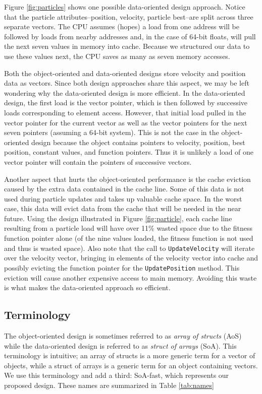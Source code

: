 Figure \ref{fig:particles} shows one possible data-oriented design
approach. Notice that the particle attributes--position, velocity, particle
best--are split across three separate vectors. The CPU
assumes (hopes) a load from one address will be followed by loads from nearby
addresses and, in the case of 64-bit floats, will pull the next seven values in
memory into cache. Because we structured our data to use these values next, the
CPU saves as many as seven memory accesses.

Both the object-oriented and data-oriented designs store velocity and position
data as vectors. Since both design approaches share this aspect, we may be left
wondering why the data-oriented design is more efficient. In the
data-oriented design, the first load is the vector pointer, which is then
followed by successive loads corresponding to element access. However, that
initial load pulled in the vector pointer for the current vector as well as the
vector pointers for the next seven pointers (assuming a 64-bit system). This is
not the case in the object-oriented design because the object contains pointers
to velocity, position, best position, constant values, and function
pointers. Thus it is unlikely a load of one vector pointer will contain the
pointers of successive vectors.

Another aspect that hurts the object-oriented performance is the cache eviction
caused by the extra data contained in the cache line. Some of this data is not
used during particle updates and takes up valuable cache space. In the worst case,
this data will evict data from the cache that will be needed in the near
future. Using the design illustrated in Figure \ref{fig:particle}, each cache
line resulting from a particle load will have over 11\% wasted space due to the
fitness function pointer alone (of the nine values loaded, the fitness function is
not used and thus is wasted space). Also note that the call to
\texttt{UpdateVelocity} will iterate over the velocity vector, bringing in
elements of the velocity vector into cache and possibly evicting the function
pointer for the \texttt{UpdatePosition} method. This eviction will cause another
expensive access to main memory. Avoiding this waste is what makes the
data-oriented approach so efficient.


\subsection{Terminology}
The object-oriented design is sometimes referred to as \emph{array of structs} (AoS) while
the data-oriented design is referred to as \emph{struct of arrays} (SoA). This
terminology is intuitive; an array of structs is a more generic term for a
vector of objects, while a struct of arrays is a generic term for an object
containing vectors.
We use this terminology and add a third: SoA-fast, which
represents our proposed design. These names are summarized in
Table \ref{tab:names}

